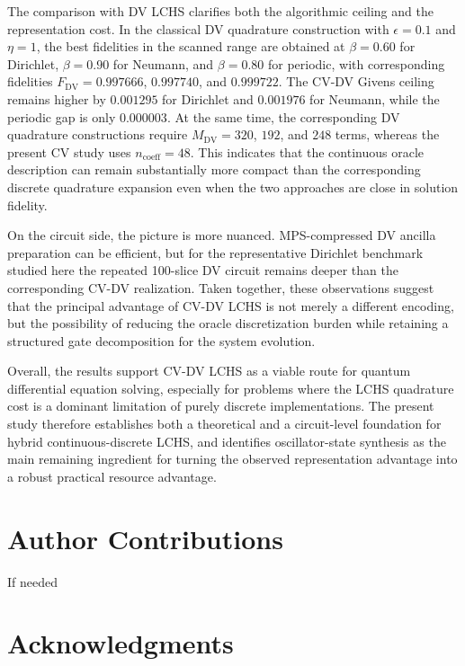 \documentclass{article}
\begin{document}
The comparison with DV LCHS clarifies both the algorithmic ceiling and the representation cost. In the classical DV quadrature construction with $\epsilon=0.1$ and $\eta=1$, the best fidelities in the scanned range are obtained at $\beta=0.60$ for Dirichlet, $\beta=0.90$ for Neumann, and $\beta=0.80$ for periodic, with corresponding fidelities $F_{\mathrm{DV}}=0.997666$, $0.997740$, and $0.999722$. The CV-DV Givens ceiling remains higher by $0.001295$ for Dirichlet and $0.001976$ for Neumann, while the periodic gap is only $0.000003$. At the same time, the corresponding DV quadrature constructions require $M_{\mathrm{DV}}=320$, $192$, and $248$ terms, whereas the present CV study uses $n_{\mathrm{coeff}}=48$. This indicates that the continuous oracle description can remain substantially more compact than the corresponding discrete quadrature expansion even when the two approaches are close in solution fidelity.

On the circuit side, the picture is more nuanced. MPS-compressed DV ancilla preparation can be efficient, but for the representative Dirichlet benchmark studied here the repeated 100-slice DV circuit remains deeper than the corresponding CV-DV realization. Taken together, these observations suggest that the principal advantage of CV-DV LCHS is not merely a different encoding, but the possibility of reducing the oracle discretization burden while retaining a structured gate decomposition for the system evolution.

Overall, the results support CV-DV LCHS as a viable route for quantum differential equation solving, especially for problems where the LCHS quadrature cost is a dominant limitation of purely discrete implementations. 
The present study therefore establishes both a theoretical and a circuit-level foundation for hybrid continuous-discrete LCHS, and identifies oscillator-state synthesis as the main remaining ingredient for turning the observed representation advantage into a robust practical resource advantage.





\section{Author Contributions}
If needed


\section{Acknowledgments}
\end{document}
